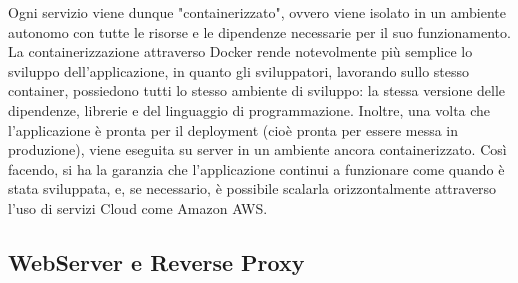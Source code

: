 Ogni servizio viene dunque "containerizzato", ovvero viene isolato in un ambiente autonomo con tutte le risorse e le dipendenze necessarie per il suo funzionamento. La containerizzazione attraverso Docker rende notevolmente più semplice lo sviluppo dell'applicazione, in quanto gli sviluppatori, lavorando sullo stesso container, possiedono tutti lo stesso ambiente di sviluppo: la stessa versione delle dipendenze, librerie e del linguaggio di programmazione. Inoltre, una volta che l'applicazione è pronta per il deployment (cioè pronta per essere messa in produzione), viene eseguita su server in un ambiente ancora containerizzato. Così facendo, si ha la garanzia che l'applicazione continui a funzionare come quando è stata sviluppata, e, se necessario, è possibile scalarla orizzontalmente attraverso l'uso di servizi Cloud come Amazon AWS.

\subsection{WebServer e Reverse Proxy}

